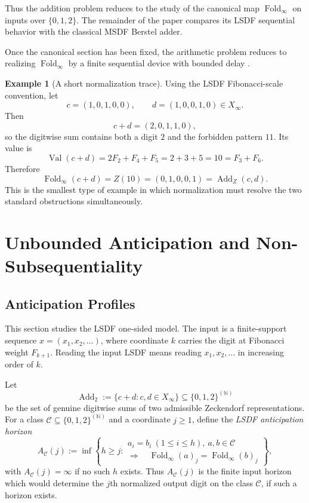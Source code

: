 \documentclass[11pt,letterpaper]{article}
\numberwithin{equation}{section}
\theoremstyle{plain}
\theoremstyle{definition}
\newtheorem{example}[theorem]{Example}
\theoremstyle{remark}
\newcommand{\NN}{\mathbb{N}}
\newcommand{\Xinf}{X_\infty}
\DeclareMathOperator{\Val}{Val}
\DeclareMathOperator{\Fold}{Fold}
\newcommand{\ZAdd}{\operatorname{Add}_{Z}}
\newcommand{\AddTwo}{\operatorname{Add}_{2}}
\begin{document}
Thus the addition problem reduces to the study of the canonical map
$\Fold_\infty$ on inputs over $\{0,1,2\}$.  The remainder of the paper
compares its LSDF sequential behavior with the classical MSDF Berstel adder.

Once the canonical section has been fixed, the arithmetic problem reduces to
realizing $\Fold_\infty$ by a finite sequential device with bounded delay
\cite{Frougny1992NumbersAutomata,Frougny1999OnlineAddition,
AhlbachUsatineFrougnyPippenger2013}.

\begin{example}[A short normalization trace]\label{rem:worked-normalization-example}
Using the LSDF Fibonacci-scale convention, let
\[
c=(1,0,1,0,0),\qquad d=(1,0,0,1,0)\in \Xinf.
\]
Then
\[
c+d=(2,0,1,1,0),
\]
so the digitwise sum contains both a digit $2$ and the forbidden pattern $11$.
Its value is
\[
\Val(c+d)=2F_2+F_4+F_5=2+3+5=10=F_3+F_6.
\]
Therefore
\[
\Fold_\infty(c+d)=Z(10)=(0,1,0,0,1)=\ZAdd(c,d).
\]
This is the smallest type of example in which normalization must resolve the
two standard obstructions simultaneously.
\end{example}

\section{Unbounded Anticipation and Non-Subsequentiality}\label{sec:streaming}

\subsection{Anticipation Profiles}

This section studies the LSDF one-sided model.  The input is a
finite-support sequence $x=(x_1,x_2,\ldots)$, where coordinate $k$ carries the
digit at Fibonacci weight $F_{k+1}$.  Reading the input LSDF means reading
$x_1,x_2,\ldots$ in increasing order of $k$.

Let
\[
\AddTwo:=\{c+d:c,d\in\Xinf\}\subseteq \{0,1,2\}^{(\NN)}
\]
be the set of genuine digitwise sums of two admissible Zeckendorf
representations.  For a class
$\mathcal C\subseteq\{0,1,2\}^{(\NN)}$ and a coordinate $j\ge 1$, define the
\emph{LSDF anticipation horizon}
\[
A_{\mathcal C}(j)
:=
\inf\left\{
h\ge j:
\begin{array}{l}
a_i=b_i\ (1\le i\le h),\ a,b\in\mathcal C\\
\Longrightarrow\quad
\Fold_\infty(a)_j=\Fold_\infty(b)_j
\end{array}
\right\},
\]
with $A_{\mathcal C}(j)=\infty$ if no such $h$ exists.  Thus
$A_{\mathcal C}(j)$ is the finite input horizon which would determine the
$j$th normalized output digit on the class $\mathcal C$, if such a horizon
exists.
\end{document}
